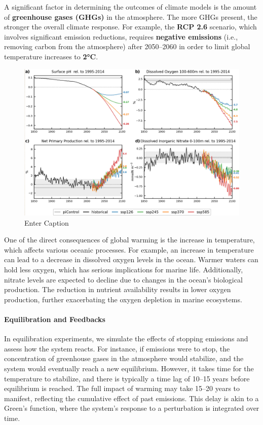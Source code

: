 A significant factor in determining the outcomes of climate models is the amount of \textbf{greenhouse gases (GHGs)} in the atmosphere. The more GHGs present, the stronger the overall climate response. For example, the \textbf{RCP 2.6} scenario, which involves significant emission reductions, requires \textbf{negative emissions} (i.e., removing carbon from the atmosphere) after 2050–2060 in order to limit global temperature increases to \textbf{2°C}.
\begin{figure}[htpb]
	\centering
	\includegraphics[width=0.5\linewidth]{uploads/predictions.png}
	\caption{Enter Caption}
	\label{fig:enter-label}
\end{figure}

One of the direct consequences of global warming is the increase in temperature, which affects various oceanic processes. For example, an increase in temperature can lead to a decrease in dissolved oxygen levels in the ocean. Warmer waters can hold less oxygen, which has serious implications for marine life. Additionally, nitrate levels are expected to decline due to changes in the ocean's biological production. The reduction in nutrient availability results in lower oxygen production, further exacerbating the oxygen depletion in marine ecosystems.

\paragraph{Equilibration and Feedbacks}

In equilibration experiments, we simulate the effects of stopping emissions and assess how the system reacts. For instance, if emissions were to stop, the concentration of greenhouse gases in the atmosphere would stabilize, and the system would eventually reach a new equilibrium. However, it takes time for the temperature to stabilize, and there is typically a time lag of 10–15 years before equilibrium is reached. The full impact of warming may take 15–20 years to manifest, reflecting the cumulative effect of past emissions. This delay is akin to a Green's function, where the system's response to a perturbation is integrated over time.

